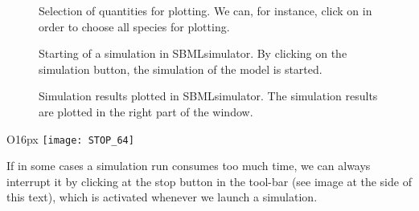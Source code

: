 \begin{figure}[t]
\centering
{}
\caption[Selection of quantities for plotting]{Selection of quantities for plotting.
We can, for instance, click on  in order to choose all species for plotting.}
\label{fig:selectSpecies}
\end{figure}
\begin{figure}[t]
\centering
{}
\caption[Starting of a simulation in SBMLsimulator]{Starting of a simulation in SBMLsimulator.
By clicking on the simulation button, the simulation of the model is started.}
\label{fig:startSimulation}
\end{figure}
\begin{figure}[t]
\centering
{}
\caption[Simulation results plotted in SBMLsimulator]{Simulation results plotted in SBMLsimulator.
The simulation results are plotted in the right part of the window.}
\label{fig:simulationResults}
\end{figure}
\begin{wrapfigure}{O}{16px}
\vspace{\wrapfigspace}
\texttt{[image: STOP\_64]}
\end{wrapfigure}
If in some cases a simulation run consumes too much time, we can always interrupt it by clicking at the stop button in the tool-bar (see image at the side of this text), which is activated whenever we launch a simulation.
